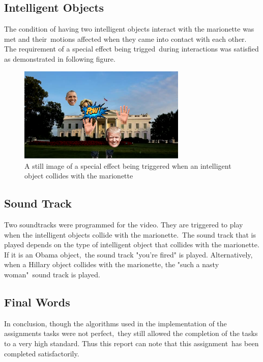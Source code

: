 \documentclass[12pt,a4paper]{article}
\begin{document}
      \subsection{Intelligent Objects}

      The condition of having two intelligent objects interact with the marionette was met and their\
      motions affected when they came into contact with each other. The requirement of a special effect being trigged\
      during interactions was satisfied as demonstrated in following figure.

      \begin{figure}[H]
        \includegraphics[width=8cm]{pow}
        \caption{A still image of a special effect being triggered when an intelligent object collides with the marionette}
      \end{figure}

      \subsection{Sound Track}

      Two soundtracks were programmed for the video. They are triggered to play when the intelligent objects collide with the marionette.\
      The sound track that is played depends on the type of intelligent object that collides with the marionette. If it is an Obama object,\
      the sound track "you're fired" is played. Alternatively, when a Hillary object collides with the marionette, the "such a nasty woman"\
      sound track is played.

      \subsection{Final Words}

      In conclusion, though the algorithms used in the implementation of the assignments tasks were not perfect,\
      they still allowed the completion of the tasks to a very high standard. Thus this report can note that this assignment\
      has been completed satisfactorily.

    \listoffigures
\end{document}
